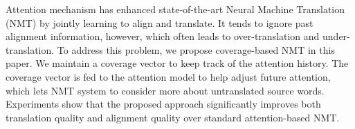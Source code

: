 Attention mechanism has enhanced state-of-the-art Neural Machine Translation (NMT) by jointly learning to align and translate. It tends to ignore past alignment information, however, which often leads to over-translation and under-translation. To address this problem, we propose coverage-based NMT in this paper. We maintain a coverage vector to keep track of the attention history. The coverage vector is fed to the attention model to help adjust future attention, which lets NMT system to consider more about untranslated source words. Experiments show that the proposed approach significantly improves both translation quality and alignment quality over standard attention-based NMT.
